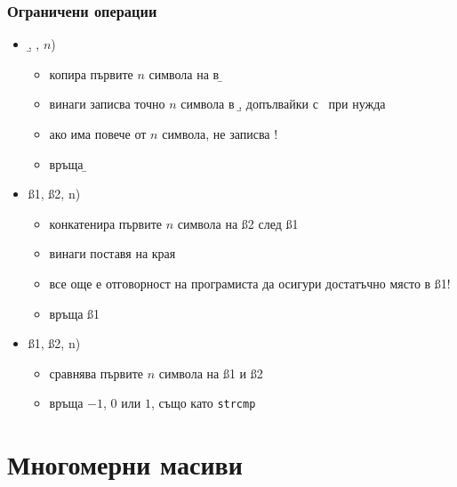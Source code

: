 \documentclass{beamer}
\begin{document}
\begin{frame}
  \frametitle{Ограничени операции}

  \begin{itemize}[<+->]
  \item {}\b, \s, $n$\tta)
    \begin{itemize}
    \item копира първите $n$ символа на \s в \b
    \item винаги записва точно $n$ символа в \b, допълвайки с \term\ при нужда
    \item \alert{ако \s има повече от $n$ символа, не записва \term!}
    \item връща \b
    \end{itemize}
  \item {}\ss1, \ss2, n\tta)
    \begin{itemize}
    \item конкатенира първите $n$ символа на \ss2 след \ss1
    \item винаги поставя \term на края
    \item \alert{все още е отговорност на програмиста да осигури достатъчно място в \ss1!}
    \item връща \ss1
    \end{itemize}
  \item {}\ss1, \ss2, n\tta)
    \begin{itemize}
    \item сравнява първите $n$ символа на \ss1 и \ss2
    \item връща $-1$, $0$ или $1$, също като \tt{strcmp}
    \end{itemize}
  \end{itemize}
\end{frame}

\section{Многомерни масиви}
\end{document}

